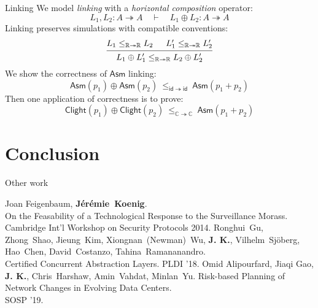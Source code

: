 \documentclass[aspectratio=141]{beamer}
\newcommand{\kw}[1]{\ensuremath{ \mathsf{#1} }}
\newcommand{\fme}{\textbf{J\'er\'emie~Koenig}}
\newcommand{\me}{\textbf{J. K.}}
\begin{document}
\begin{frame}{Linking} %
  We model \emph{linking} with a
  \emph{horizontal composition} operator:
  \[
    L_1, L_2 : A \twoheadrightarrow A
    \quad \vdash \quad
    L_1 \oplus L_2 : A \twoheadrightarrow A
  \]
  \pause
  Linking preserves simulations with compatible conventions:
  \[
    \begin{prooftree}
      \hypo{L_1 \le_{\mathbb{R} \twoheadrightarrow \mathbb{R}} L_2}
      \hypo{L_1' \le_{\mathbb{R} \twoheadrightarrow \mathbb{R}} L_2'}
      \infer2{L_1 \oplus L_1'
        \le_{\mathbb{R} \twoheadrightarrow \mathbb{R}}
        L_2 \oplus L_2'}
    \end{prooftree}
  \]
  \pause
  We show the correctness of $\kw{Asm}$ linking:
  \[
    \kw{Asm}(p_1) \oplus \kw{Asm}(p_2)
    \: \le_{\kw{id} \twoheadrightarrow \kw{id}} \:
    \kw{Asm}(p_1 + p_2)
  \]
  Then one application of correctness is to prove:
  \[
    \kw{Clight}(p_1) \oplus \kw{Clight}(p_2)
    \: \le_{\mathbb{C} \twoheadrightarrow \mathbb{C}} \:
    \kw{Asm}(p_1 + p_2)
  \]
\end{frame}


\section{Conclusion} %

\begin{frame}{Other work} %
  \begin{thebibliography}{10}
      Joan Feigenbaum, \fme.
      \newblock \\
      On the Feasability of
      a Technological Response to the Surveillance Morass.
      \newblock \\
      Cambridge Int'l Workshop on Security Protocols 2014.
      Ronghui~Gu, Zhong~Shao, Jieung~Kim, Xiongnan~(Newman)~Wu,
      \me, Vilhelm~Sj\"oberg, Hao~Chen,
      David~Costanzo, Tahina~Ramananandro.
      \newblock \\
      Certified Concurrent Abstraction Layers.
      \newblock
      PLDI '18.
      Omid Alipourfard, Jiaqi Gao, \me,
      Chris~Harshaw, Amin~Vahdat, Minlan~Yu.
      \newblock
      Risk-based Planning of Network Changes in Evolving Data Centers.
      \newblock \\
      SOSP '19.
  \end{thebibliography}
\end{frame}
\end{document}
